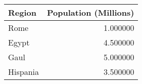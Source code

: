 \begin{tabular}{lr}
\toprule
Region & Population (Millions) \\
\midrule
Rome & 1.000000 \\
Egypt & 4.500000 \\
Gaul & 5.000000 \\
Hispania & 3.500000 \\
\bottomrule
\end{tabular}
